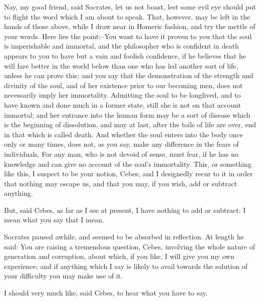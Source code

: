 Nay, my good friend, said Socrates, let us not boast, lest some evil eye
should put to flight the word which I am about to speak. That, however,
may be left in the hands of those above, while I draw near in Homeric
fashion, and try the mettle of your words. Here lies the point:--You
want to have it proven to you that the soul is imperishable and
immortal, and the philosopher who is confident in death appears to you
to have but a vain and foolish confidence, if he believes that he will
fare better in the world below than one who has led another sort of
life, unless he can prove this; and you say that the demonstration of
the strength and divinity of the soul, and of her existence prior to our
becoming men, does not necessarily imply her immortality. Admitting the
soul to be longlived, and to have known and done much in a former state,
still she is not on that account immortal; and her entrance into
the human form may be a sort of disease which is the beginning of
dissolution, and may at last, after the toils of life are over, end in
that which is called death. And whether the soul enters into the body
once only or many times, does not, as you say, make any difference in
the fears of individuals. For any man, who is not devoid of sense,
must fear, if he has no knowledge and can give no account of the soul's
immortality. This, or something like this, I suspect to be your notion,
Cebes; and I designedly recur to it in order that nothing may escape us,
and that you may, if you wish, add or subtract anything.

But, said Cebes, as far as I see at present, I have nothing to add or
subtract: I mean what you say that I mean.

Socrates paused awhile, and seemed to be absorbed in reflection. At
length he said: You are raising a tremendous question, Cebes, involving
the whole nature of generation and corruption, about which, if you like,
I will give you my own experience; and if anything which I say is likely
to avail towards the solution of your difficulty you may make use of it.

I should very much like, said Cebes, to hear what you have to say.

